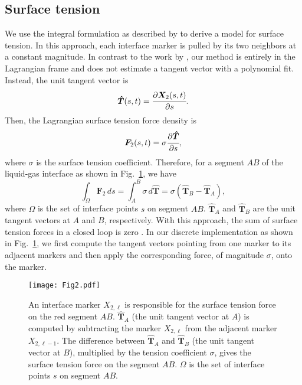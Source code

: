 \documentclass[%
 aip,
 amsmath,amssymb,
 reprint,
 floatfix
]{revtex4-1}
\begin{document}
\subsection{Surface tension}
We use the integral formulation as described by \citet{popinet2018numerical} to derive a model for surface tension. In this approach, each interface marker is pulled by its two neighbors at a constant magnitude. In contrast to the work by \citet{tryggvason2001front}, our method is entirely in the Lagrangian frame and does not estimate a tangent vector with a polynomial fit. Instead, the unit tangent vector is 
\begin{equation}
\bm{\hat{T}}(s, t) = \cfrac{\partial \bm{X}_2(s, t)}{\partial s}. 
\end{equation}
Then, the Lagrangian surface tension force density is
\begin{equation}
\bm{F}_2(s,t) = \sigma \cfrac{\partial \bm{\hat{T}}}{\partial s}, 
\end{equation}
where $\sigma$ is the surface tension coefficient. 
Therefore, for a segment $AB$ of the liquid-gas interface as shown in Fig.~\ref{fig:integralFormulation}, we have
\begin{equation}
\int_{\Omega} \bm{F}_2 \, ds = \int_{A}^{B} \sigma \, d \bm{\hat{T}} = \sigma (\bm{\hat{T}}_B - \bm{\hat{T}}_A),
\label{eq:tension}
\end{equation}
where $\Omega$ is the set of interface points $s$ on segment $AB$. $\bm{\hat{T}}_A$ and $\bm{\hat{T}}_B$ are the unit tangent vectors at $A$ and $B$, respectively. With this approach, the sum of surface tension forces in a closed loop is zero \cite{popinet2018numerical}. In our discrete implementation as shown in Fig.~\ref{fig:integralFormulation}, we first compute the tangent vectors pointing from one marker to its adjacent markers and then apply the corresponding force, of magnitude $\sigma$, onto the marker. 

\begin{figure}
    \centering
    \texttt{[image: Fig2.pdf]}
    \caption{\footnotesize{An interface marker $X_{2, \ell}$ is responsible for the surface tension force on the red segment $AB$. $\bm{\hat{T}}_A$ (the unit tangent vector at $A$) is computed by subtracting the marker $X_{2, \ell}$ from the adjacent marker $X_{2, \ell-1}$. The difference between $\bm{\hat{T}}_A$ and $\bm{\hat{T}}_B$ (the unit tangent vector at $B$), multiplied by the tension coefficient $\sigma$, gives the surface tension force on the segment $AB$. $\Omega$ is the set of interface points $s$ on segment $AB$.%
    }}
    \label{fig:integralFormulation}
\end{figure}
\end{document}
